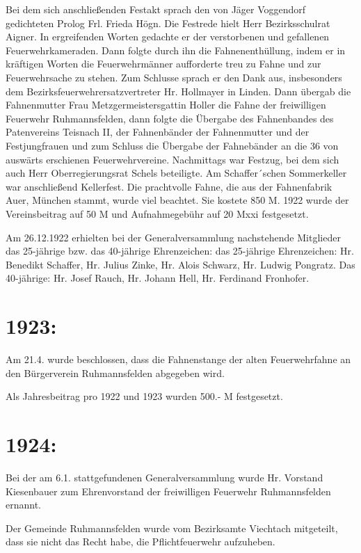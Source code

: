 \documentclass[12pt,a4paper]{book}
\begin{document}
Bei dem sich anschließenden Festakt sprach den von Jäger Voggendorf gedichteten
Prolog Frl. Frieda Högn. Die Festrede hielt Herr Bezirksschulrat Aigner. In
ergreifenden Worten gedachte er der verstorbenen und gefallenen
Feuerwehrkameraden. Dann folgte durch ihn die Fahnenenthüllung, indem er in
kräftigen Worten die Feuerwehrmänner aufforderte treu zu Fahne und zur
Feuerwehrsache zu stehen. Zum Schlusse sprach er den Dank aus, insbesonders dem
Bezirksfeuerwehrersatzvertreter Hr. Hollmayer in Linden. Dann übergab die
Fahnenmutter Frau Metzgermeistersgattin Holler die Fahne der freiwilligen
Feuerwehr Ruhmannsfelden, dann folgte die Übergabe des Fahnenbandes des
Patenvereins Teisnach II, der Fahnenbänder der Fahnenmutter und der
Festjungfrauen und zum Schluss die Übergabe der Fahnebänder an die 36 von
auswärts erschienen Feuerwehrvereine. Nachmittags war Festzug, bei dem sich auch
Herr Oberregierungsrat Schels beteiligte. Am Schaffer´schen Sommerkeller war
anschließend Kellerfest. Die prachtvolle Fahne, die aus der Fahnenfabrik Auer,
München stammt, wurde viel beachtet. Sie kostete 850 M. 1922 wurde der
Vereinsbeitrag auf 50 M und Aufnahmegebühr auf 20 Mxxi festgesetzt.

Am 26.12.1922 erhielten bei der Generalversammlung nachstehende Mitglieder das
25-jährige bzw. das 40-jährige Ehrenzeichen: das 25-jährige Ehrenzeichen: Hr.
Benedikt Schaffer, Hr. Julius Zinke, Hr. Alois Schwarz, Hr. Ludwig Pongratz. Das
40-jährige: Hr. Josef Rauch, Hr. Johann Hell, Hr. Ferdinand Fronhofer.

\section{1923:}

Am 21.4. wurde beschlossen, dass die Fahnenstange der alten Feuerwehrfahne an
den Bürgerverein Ruhmannsfelden abgegeben wird.

Als Jahresbeitrag pro 1922 und 1923 wurden 500.- M festgesetzt.

\section{1924:}

Bei der am 6.1. stattgefundenen Generalversammlung wurde Hr. Vorstand
Kiesenbauer zum Ehrenvorstand der freiwilligen Feuerwehr Ruhmannsfelden ernannt.

Der Gemeinde Ruhmannsfelden wurde vom Bezirksamte Viechtach mitgeteilt, dass sie
nicht das Recht habe, die Pflichtfeuerwehr aufzuheben.
\end{document}
